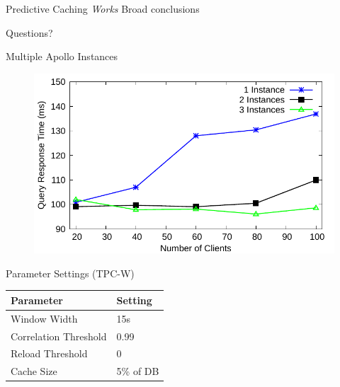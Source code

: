 \documentclass[12pt]{beamer}
\begin{document}
\begin{frame}[fragile]{Predictive Caching \emph{Works}}
Broad conclusions
\begin{centering}
Questions?
\end{centering}
\end{frame}

\begin{frame}[fragile]{Multiple Apollo Instances}
    \begin{figure}
        \center
        \includegraphics[scale=0.7]{apollo_scalability_curve}
    \end{figure}
\end{frame}

\begin{frame}[fragile]{Parameter Settings (TPC-W)}
\begin{table}
\centering
\begin{tabular}{ll}
Parameter & Setting \\
\toprule
Window Width & 15s \\
Correlation Threshold & 0.99 \\
Reload Threshold & 0 \\
Cache Size & 5\% of DB \\
\bottomrule
\end{tabular}
\end{table}

\end{frame}
\end{document}
